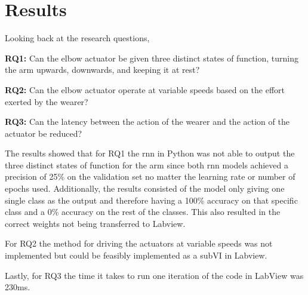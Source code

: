 \section{Results}
\label{section:results}

%
%
%
Looking back at the research questions,

\textbf{RQ1:} Can the elbow actuator be given three distinct states of function, turning the arm upwards, downwards, and keeping it at rest?

\textbf{RQ2:} Can the elbow actuator operate at variable speeds based on the effort exerted by the wearer?

\textbf{RQ3:} Can the latency between the action of the wearer and the action of the actuator be reduced?

The results showed that for RQ1 the \acrshort{rnn} in Python was not able to output the three distinct states of 
function for the arm since both \acrshort{rnn} models achieved a precision of 25\% on the validation set no matter the
learning rate or number of epochs used. Additionally, the results consisted of the model only giving one single class as the output
and therefore having a 100\% accuracy on that specific class and a 0\% accuracy on the rest of the classes. This also resulted in 
the correct weights not being transferred to Labview.

For RQ2 the method for driving the actuators at variable speeds was not implemented but could be feasibly implemented as a subVI in Labview.  

Lastly, for RQ3 the time it takes to run one iteration of the code in LabView was 230ms.
